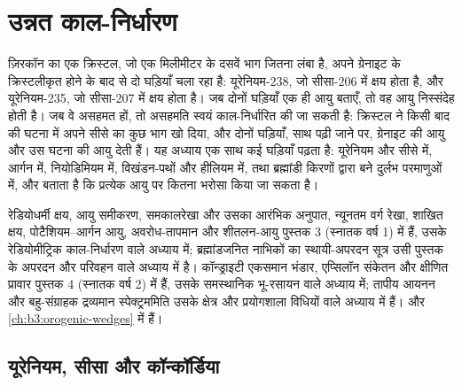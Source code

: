 \chapter{उन्नत काल-निर्धारण}\label{ch:b3:advanced-geochronology}

ज़िरकॉन का एक क्रिस्टल, जो एक मिलीमीटर के दसवें भाग जितना लंबा है, अपने ग्रेनाइट के
क्रिस्टलीकृत होने के बाद से दो घड़ियाँ चला रहा है: यूरेनियम-238, जो सीसा-206 में क्षय होता है,
और यूरेनियम-235, जो सीसा-207 में क्षय होता है। जब दोनों घड़ियाँ एक ही आयु बताएँ, तो वह
आयु निस्संदेह होती है। जब वे असहमत हों, तो असहमति स्वयं काल-निर्धारित की जा सकती है: क्रिस्टल ने
किसी बाद की घटना में अपने सीसे का कुछ भाग खो दिया, और दोनों घड़ियाँ, साथ पढ़ी जाने पर, ग्रेनाइट की आयु और उस घटना की आयु देती हैं।
यह अध्याय एक साथ कई घड़ियाँ पढ़ता है: यूरेनियम और सीसे में,
आर्गन में, नियोडिमियम में, विखंडन-पथों और हीलियम में,
तथा ब्रह्मांडी किरणों द्वारा बने दुर्लभ परमाणुओं में,
और बताता है कि प्रत्येक आयु पर कितना भरोसा किया जा सकता है।

\begin{recall}
रेडियोधर्मी क्षय, आयु समीकरण, समकालरेखा और उसका आरंभिक अनुपात,
न्यूनतम वर्ग रेखा, शाखित क्षय, पोटैशियम--आर्गन आयु, अवरोध-तापमान
और शीतलन-आयु पुस्तक 3 (स्नातक वर्ष 1) में हैं, उसके रेडियोमीट्रिक काल-निर्धारण वाले अध्याय में;
ब्रह्मांडजनित नाभिकों का स्थायी-अपरदन सूत्र उसी पुस्तक के
अपरदन और परिवहन वाले अध्याय में है। कॉन्ड्राइटी एकसमान भंडार, एप्सिलॉन संकेतन
और क्षीणित प्रावार पुस्तक 4 (स्नातक वर्ष 2) में हैं, उसके समस्थानिक भू-रसायन वाले अध्याय में;
तापीय आयनन और बहु-संग्राहक द्रव्यमान स्पेक्ट्रममिति उसके क्षेत्र और प्रयोगशाला विधियों वाले अध्याय में
हैं।  और
 \cref{ch:b3:orogenic-wedges} में हैं।
\end{recall}

\section{यूरेनियम, सीसा और कॉन्कॉर्डिया}\label{sec:b3:advanced-geochronology:upb}

